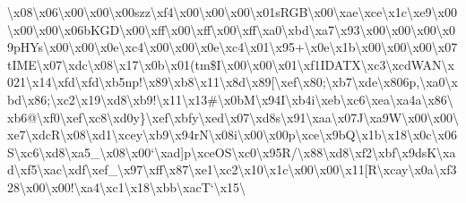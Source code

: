 \textbackslash{}x08\textbackslash{}x06\textbackslash{}x00\textbackslash{}x00\textbackslash{}x00szz\textbackslash{}xf4\textbackslash{}x00\textbackslash{}x00\textbackslash{}x00\textbackslash{}x01s\+R\+G\+B\textbackslash{}x00\textbackslash{}xae\textbackslash{}xce\textbackslash{}x1c\textbackslash{}xe9\textbackslash{}x00\textbackslash{}x00\textbackslash{}x00\textbackslash{}x06b\+K\+G\+D\textbackslash{}x00\textbackslash{}xff\textbackslash{}x00\textbackslash{}xff\textbackslash{}x00\textbackslash{}xff\textbackslash{}xa0\textbackslash{}xbd\textbackslash{}xa7\textbackslash{}x93\textbackslash{}x00\textbackslash{}x00\textbackslash{}x00\textbackslash{}x09p\+H\+Ys\textbackslash{}x00\textbackslash{}x00\textbackslash{}x0e\textbackslash{}xc4\textbackslash{}x00\textbackslash{}x00\textbackslash{}x0e\textbackslash{}xc4\textbackslash{}x01\textbackslash{}x95+\textbackslash{}x0e\textbackslash{}x1b\textbackslash{}x00\textbackslash{}x00\textbackslash{}x00\textbackslash{}x07t\+I\+M\+E\textbackslash{}x07\textbackslash{}xdc\textbackslash{}x08\textbackslash{}x17\textbackslash{}x0b\textbackslash{}x01(tm\$\+I\textbackslash{}x00\textbackslash{}x00\textbackslash{}x01\textbackslash{}xf1\+I\+D\+A\+T\+X\textbackslash{}xc3\textbackslash{}xcd\+W\+A\+N\textbackslash{}x021\textbackslash{}x14\textbackslash{}xfd\textbackslash{}xfd\textbackslash{}xb5np!\textbackslash{}x89\textbackslash{}xb8\textbackslash{}x11\textbackslash{}x8d\textbackslash{}x89\mbox{[}\textbackslash{}xef\textbackslash{}x80;\textbackslash{}xb7\textbackslash{}xde\textbackslash{}x806p,\textbackslash{}xa0\textbackslash{}xbd\textbackslash{}x86;\textbackslash{}xc2\textbackslash{}x19\textbackslash{}xd8\textbackslash{}xb9!\textbackslash{}x11\textbackslash{}x13\#\textbackslash{}x0b\+M\textbackslash{}x94\+I\textbackslash{}xb4i\textbackslash{}xeb\textbackslash{}xc6\textbackslash{}xea\textbackslash{}xa4a\textbackslash{}x86\textbackslash{}xb6@\textbackslash{}xf0\textbackslash{}xef\textbackslash{}xc8\textbackslash{}xd0y\}\textbackslash{}xef\textbackslash{}xbfy\textbackslash{}xed\textbackslash{}x07\textbackslash{}xd8s\textbackslash{}x91\textbackslash{}xaa\textbackslash{}x07\+J\textbackslash{}xa9\+W\textbackslash{}x00\textbackslash{}x00\textbackslash{}xe7\textbackslash{}xdc\+R\textbackslash{}x08\textbackslash{}xd1\textbackslash{}xcey\textbackslash{}xb9\textbackslash{}x94r\+N\textbackslash{}x08i\textbackslash{}x00\textbackslash{}x00p\textbackslash{}xce\textbackslash{}x9b\+Q\textbackslash{}x1b\textbackslash{}x18\textbackslash{}x0c\textbackslash{}x06\+S\textbackslash{}xc6\textbackslash{}xd8\textbackslash{}xa5\+\_\+\textbackslash{}x08\textbackslash{}x00`\textbackslash{}xad\mbox{]}p\textbackslash{}xce\+O\+S\textbackslash{}xc0\textbackslash{}x95\+R/\textbackslash{}x88\textbackslash{}xd8\textbackslash{}xf2\textbackslash{}xbf\textbackslash{}x9ds\+K\textbackslash{}xad\textbackslash{}xf5\textbackslash{}xac\textbackslash{}xdf\textbackslash{}xef\+\_\+\textbackslash{}x97\textbackslash{}xff\textbackslash{}x87\textbackslash{}xe1\textbackslash{}xc2\textbackslash{}x10\textbackslash{}x1c\textbackslash{}x00\textbackslash{}x00\textbackslash{}x11\mbox{[}\+R\textbackslash{}xcay\textbackslash{}x0a\textbackslash{}xf328\textbackslash{}x00\textbackslash{}x00!\textbackslash{}xa4\textbackslash{}xc1\textbackslash{}x18\textbackslash{}xbb\textbackslash{}xac\+T`\textbackslash{}x15\textbackslash{}